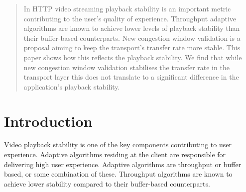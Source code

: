 \documentclass[10pt,sigconf]{acmart}
\newcommand{\maketitleSTD}{}
\newcommand{\maketitleACM}{\maketitle}
\newcommand{\maketitleSTD}{\maketitle}
\newcommand{\maketitleACM}{}
\begin{document}

\maketitleSTD
\begin{abstract}

In HTTP video streaming playback stability is an important metric contributing to the user's quality of experience. Throughput adaptive algorithms are known to achieve lower levels of playback stability than their buffer-based counterparts. New congestion window validation is a proposal aiming to keep the transport's transfer rate more stable. This paper shows how this reflects the playback stability. We find that while new congestion window validation stabilises the transfer rate in the transport layer this does not translate to a significant difference in the application's playback stability. 

\end{abstract}
\maketitleACM


\section{Introduction}

%



Video playback stability is one of the key components contributing to user experience. Adaptive algorithms residing at the client are responsible for delivering high user experience. Adaptive algorithms are throughput or buffer based, or some combination of these. Throughput algorithms are known to achieve lower stability compared to their buffer-based counterparts.
\end{document}
